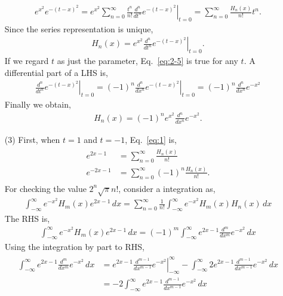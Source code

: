 \documentclass[floatfix,nofootinbib,superscriptaddress,fleqn]{revtex4-2}
\begin{document}
\begin{itemize}
\begin{align*}
  e^{x^2}e^{-(t-x)^2} = \left.e^{x^2}\sum^\infty_{n=0}\frac{t^n}{n!}
  \frac{d^n}{dt^n}e^{-(t-x)^2}\right|_{t=0} 
  = \sum^\infty_{n=0}\frac{H_n(x)}{n!}t^n.
\end{align*}
Since the series representation is unique,
\begin{align}\label{eq:2-5}
  H_n(x)=e^{x^2}\left.\frac{d^n}{dt^n}e^{-(t-x)^2}\right|_{t=0}.
\end{align}
If we regard $t$ as just the parameter, Eq.~\eqref{eq:2-5} is true for 
any $t$. 
A differential part of a LHS is,
\begin{align*}
  \left.\frac{d^n}{dt^n}e^{-(t-x)^2}\right|_{t=0}
  =\left.(-1)^n\frac{d^n}{dx^n}e^{-(t-x)^2}\right|_{t=0}
  =(-1)^n\frac{d^n}{dx^n}e^{-x^2}
\end{align*}
Finally we obtain,
\begin{align}\label{eq:2-5-1}
  H_n(x) = (-1)^ne^{x^2}\frac{d^n}{dx^n}e^{-x^2}.
\end{align}
\item[(3)]First, when $t=1$ and $t=-1$, Eq.~\eqref{eq:1} is,
\begin{align*}
  \begin{split}
    e^{2x-1}&=\sum^\infty_{n=0}\frac{H_n(x)}{n!} \\
    e^{-2x-1}&=\sum^\infty_{n=0}(-1)^n\frac{H_n(x)}{n!}.
  \end{split}
\end{align*} 
For checking the value $2^n \sqrt{\pi}n!$, consider a integration as,
\begin{align}\label{eq:2-6}
  \int_{-\infty}^{\infty}e^{-x^2}H_m(x)e^{2x-1}\,dx
  =\sum_{n=0}^\infty\frac{1}{n!}\int_{-\infty}^{\infty}e^{-x^2}H_m(x)H_n(x)\,dx
\end{align}
The RHS is,
\begin{align*}
  \int_{-\infty}^{\infty}e^{-x^2}H_m(x)e^{2x-1}\,dx 
  =(-1)^m\int_{-\infty}^{\infty}e^{2x-1}\frac{d^m}{dx^m}e^{-x^2}\,dx
\end{align*}
Using the integration by part to RHS,
\begin{align*}
  \begin{split}
    \int_{-\infty}^{\infty}e^{2x-1}\frac{d^m}{dx^m}e^{-x^2}\,dx  
    &=\left.e^{2x-1}\frac{d^{m-1}}{dx^{m-1}}e^{-x^2}\right|^\infty_{-\infty}
    -\int_{-\infty}^{\infty}2e^{2x-1}\frac{d^{m-1}}{dx^{m-1}}e^{-x^2}\,dx \\
    &=-2\int_{-\infty}^{\infty}e^{2x-1}\frac{d^{m-1}}{dx^{m-1}}e^{-x^2}\,dx 
  \end{split}
\end{align*}

\end{itemize}
\end{document}
